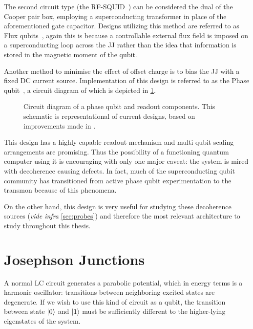 The second circuit type (the RF-SQUID~\cite{Barone1982}) can be considered the dual of the Cooper pair box, employing a superconducting transformer in place of the aforementioned gate capacitor.
Designs utilizing this method are referred to as Flux qubits~\cite{Mooij1999,VanderWal2000,Chiorescu2003}, again this is because a controllable external flux field is imposed on a superconducting loop across the JJ rather than the idea that information is stored in the magnetic moment of the qubit.

Another method to minimise the effect of offset charge is to bias the JJ with a fixed DC current source.
Implementation of this design is referred to as the Phase qubit~\cite{Clarke1988,Martinis2002}, a circuit diagram of which is depicted in \cref{fig:qubit}.

\begin{figure}[htp]
\resizebox{0.75\textwidth}{!}{}
\caption[Phase Qubit Circuit Diagram]{\label{fig:qubit}Circuit diagram of a phase qubit and readout components. This schematic is representational of current designs, based on improvements made in .}
\end{figure}

This design has a highly capable readout mechanism and multi-qubit scaling arrangements are promising.
Thus the possibility of a functioning quantum computer using it is encouraging with only one major caveat: the system is mired with decoherence causing defects.
In fact, much of the superconducting qubit community has transitioned from active phase qubit experimentation to the transmon because of this phenomena.

On the other hand, this design is very useful for studying these decoherence sources (\textit{vide infra} \cref{sec:probes}) and therefore the most relevant architecture to study throughout this thesis.

\section{Josephson Junctions}\label{sec:jj}
A normal LC circuit generates a parabolic potential, which in energy terms is a harmonic oscillator: transitions between neighboring excited states are degenerate.
If we wish to use this kind of circuit as a qubit, the transition between state $\lvert0\rangle$ and $\lvert1\rangle$ must be sufficiently different to the higher-lying eigenstates of the system.

